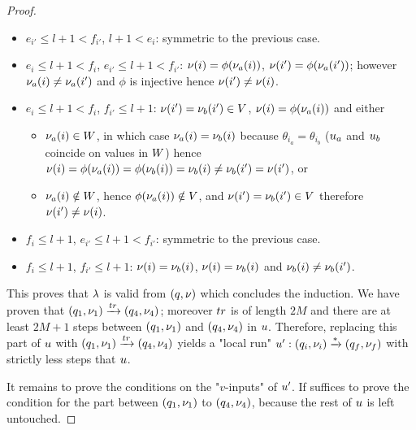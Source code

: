 \begin{proof}
\begin{itemize}
		\item $e_{i'} \leq l+1 < f_{i'}$, $l+1<e_{i}$: symmetric to the previous case.
		
		\item $e_i \leq l+1 < f_i$, $e_{i'} \leq l+1 < f_{i'}$: $\nu(i) = \phi(\nu_a(i))$, $\nu(i') = \phi(\nu_a(i'))$; however $\nu_a(i) \ne \nu_a(i')$ and $\phi$ is injective hence $\nu(i') \ne \nu(i)$.
		
		\item $e_i \leq l+1 < f_i$, $f_{i'} \leq l+1$: $\nu(i') = \nu_b(i') \in V$, $\nu(i) = \phi(\nu_a(i))$  and either
		\begin{itemize}
			\item $\nu_a(i) \in W$, in which case $\nu_a(i) = \nu_b(i)$ because $\theta_{i_a} = \theta_{i_b}$ ($u_a$ and $u_b$ coincide on values in $W$) hence $\nu(i) = \phi(\nu_a(i)) = \phi(\nu_b(i)) = \nu_b(i) \neq  \nu_b(i') = \nu(i')$, or
			\item $\nu_a(i) \notin W$, hence $\phi(\nu_a(i)) \notin V$, and $\nu(i') = \nu_b(i') \in V$ therefore $\nu(i') \ne \nu(i)$.
		\end{itemize}
		
		
		\item $f_i \leq l+1$, $e_{i'} \leq l+1 < f_{i'}$: symmetric to the previous case.
		
		\item $f_i \leq l+1$, $f_{i'} \leq l+1$: $\nu(i)= \nu_b(i)$, $\nu(i)= \nu_b(i)$ and $\nu_b(i) \ne \nu_b(i')$. 
	\end{itemize}
	
	This proves that $\lambda$ is valid from $(q,\nu)$ which concludes the induction. 
	We have proven that $(q_1,\localdata_1) \step{\atrace} (q_4, \localdata_4)$; moreover $\atrace$ is of length $2M$ and there are at least $2M+1$ steps between $(q_1,\nu_1)$ and $(q_4, \nu_4)$ in $u$. Therefore, replacing this part of $u$ with $(q_1,\localdata_1) \step{\atrace} (q_4, \localdata_4)$ yields a "local run" $u': (q_i, \nu_i) \xrightarrow{*} (q_f,\nu_f)$ with strictly less steps that $u$. 
	
	It remains to prove the conditions on the "$v$-inputs" of $u'$. If suffices to prove the condition for the part between $(q_1, \nu_1)$ to $(q_4, \nu_4)$,
	because the rest of $u$ is left untouched. 
	

\end{proof}
